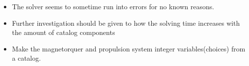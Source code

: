 \documentclass[11pt]{article}
\providecommand{\tightlist}{%
      \setlength{\itemsep}{0pt}\setlength{\parskip}{0pt}}
\begin{document}
\begin{itemize}
\tightlist
\item
  The solver seems to sometime run into errors for no known reasons.
\item
  Further investigation should be given to how the solving time
  increases with the amount of catalog components
\item
  Make the magnetorquer and propulsion system integer variables(choices)
  from a catalog.
\end{itemize}


    
    
    
    
\end{document}
